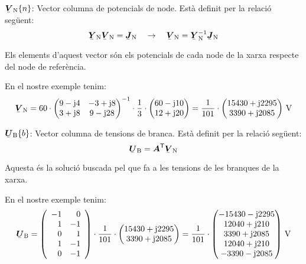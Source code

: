 \begin{list}{}
   \item[$\mcmplx{V}\ped{N}\{n\}$:] Vector columna de potencials de node. Est\`{a} definit per la relaci\'{o} seg\"{u}ent:
   \begin{equation}
      \mcmplx{Y}\ped{N} \mcmplx{V}\ped{N} = \mcmplx{J}\ped{N} \quad\rightarrow\quad
      \mcmplx{V}\ped{N} = \mcmplx{Y}\ped{N}^{-1} \mcmplx{J}\ped{N} \label{eq:vn}
   \end{equation}

   Els elements d'aquest vector s\'{o}n els potencials de cada node de la xarxa respecte del node de refer\`{e}ncia.

   En el nostre exemple tenim:
   \[
      \mcmplx{V}\ped{N} = 60 \cdot
      \begin{pmatrix}
            9 - \ju 4 & -3 + \ju 8 \\
            3 + \ju 8 & 9 - \ju 28
      \end{pmatrix} ^{-1} \cdot
      \frac{1}{3} \cdot \begin{pmatrix}
            60 - \ju 10 \\
            12 + \ju 20
      \end{pmatrix}
      =
      \frac{1}{101} \cdot \begin{pmatrix}
            15430 + \ju 2295 \\
            3390 + \ju 2085
      \end{pmatrix}\unit{V}
      \label{eq:vn_exemp}
   \]

   \item[$\mcmplx{U}\ped{B}\{b\}$:] Vector columna de tensions de branca. Est\`{a} definit per la relaci\'{o} seg\"{u}ent:
   \begin{equation}
      \mcmplx{U}\ped{B} = \transp{\boldsymbol{A}} \mcmplx{V}\ped{N} \label{eq:ur}
   \end{equation}

   Aquesta \'{e}s la soluci\'{o} buscada pel que fa a les tensions de les branques de la xarxa.

   En el nostre exemple tenim:
   \[
      \mcmplx{U}\ped{B} =
      \left(\begin{array}{rr} -1 & 0 \\ 1  & -1 \\  0 & 1 \\ 1 & -1 \\ 0 & -1
      \end{array}\right) \cdot
      \frac{1}{101} \cdot \begin{pmatrix}
            15430 + \ju 2295 \\
            3390 + \ju 2085
      \end{pmatrix} =
      \frac{1}{101} \cdot \begin{pmatrix}
            -15430 - \ju 2295 \\
            12040 + \ju 210  \\
            3390 + \ju 2085 \\
            12040 + \ju 210  \\
            -3390 - \ju 2085
      \end{pmatrix}\unit{V}
   \]


\end{list}
